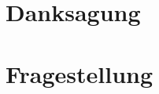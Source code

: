 \documentclass[12pt,pagesize,twoside,DIV=12,headsepline=0.4pt]{scrbook}
\begin{document}



\tableofcontents					%

\chapter*{Danksagung}
\label{ch:danksagung}
\chapter*{\abstractname}



\chapter{Fragestellung}
\label{ch:fragestellung} %
\end{document}
